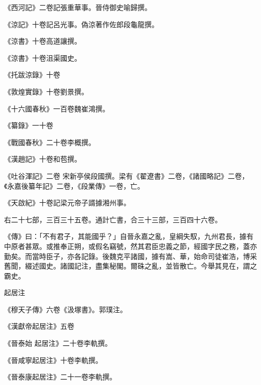 \begin{pinyinscope}
 《西河記》二卷記張重華事。晉侍御史喻歸撰。



 《涼記》十卷記呂光事。偽涼著作佐郎段龜龍撰。



 《涼書》十卷高道讓撰。



 《涼書》十卷沮渠國史。



 《托跋涼錄》十卷



 《敦煌實錄》十卷劉景撰。



 《十六國春秋》一百卷魏崔鴻撰。



 《纂錄》一十卷



 《戰國春秋》二十卷李概撰。



 《漢趙記》十卷和苞撰。



 《吐谷渾記》二卷
 宋新亭侯段國撰。梁有《翟遼書》二卷，《諸國略記》二卷，《永嘉後纂年記》二卷，《段業傳》一卷，亡。



 《天啟紀》十卷記梁元帝子諝據湘州事。



 右二十七部，三百三十五卷。通計亡書，合三十三部，三百四十六卷。



 《傳》曰：「不有君子，其能國乎？」自晉永嘉之亂，皇綱失馭，九州君長，據有中原者甚眾。或推奉正朔，或假名竊號，然其君臣忠義之節，經國字民之務，蓋亦勤矣。而當時臣子，亦各記錄。後魏克平諸國，據有嵩、華，始命司徒崔浩，博采舊聞，綴述國史。諸國記注，盡集秘閣。爾硃之亂，並皆散亡。今舉其見在，謂之霸史。



 起居注



 《穆天子傳》六卷《汲塚書》。郭璞注。



 《漢獻帝起居注》五卷



 《晉泰始
 起居注》二十卷李軌撰。



 《晉咸寧起居注》十卷李軌撰。



 《晉泰康起居注》二十一卷李軌撰。




\end{pinyinscope}
